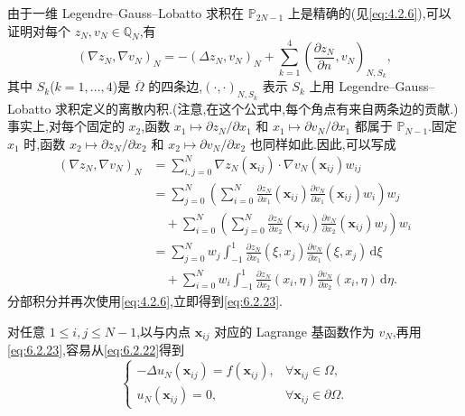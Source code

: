 由于一维 Legendre--Gauss--Lobatto 求积在 \(\mathbb P_{2N-1}\) 上是精确的(见\eqref{eq:4.2.6}),可以证明对每个 \(z_N,v_N\in\mathbb Q_N\),有
\begin{equation}\label{eq:6.2.23}
  (\nabla z_N,\nabla v_N)_N=-(\Delta z_N,v_N)_N
      +\sum_{k=1}^4\left(\frac{\partial z_N}{\partial n},v_N\right)_{N,S_k},
\end{equation}
其中 \(S_k\)(\(k=1,\ldots,4\))是 \(\overline\Omega\) 的四条边,\((\cdot,\cdot)_{N,S_k}\) 表示 \(S_k\) 上用 Legendre--Gauss--Lobatto 求积定义的离散内积.(注意,在这个公式中,每个角点有来自两条边的贡献.)事实上,对每个固定的 \(x_2\),函数 \(x_1\mapsto\partial z_N/\partial x_1\) 和 \(x_1\mapsto\partial v_N/\partial x_1\) 都属于 \(\mathbb P_{N-1}\).固定 \(x_1\) 时,函数 \(x_2\mapsto\partial z_N/\partial x_2\) 和 \(x_2\mapsto\partial v_N/\partial x_2\) 也同样如此.因此,可以写成
\[
  \begin{aligned}
    (\nabla z_N,\nabla v_N)_N
      &=\sum_{i,j=0}^N\nabla z_N(\boldsymbol{x}_{ij})\cdot\nabla v_N(\boldsymbol{x}_{ij})w_{ij}\\
      &=\sum_{j=0}^N\left(\sum_{i=0}^N
          \frac{\partial z_N}{\partial x_1}(\boldsymbol{x}_{ij})
          \frac{\partial v_N}{\partial x_1}(\boldsymbol{x}_{ij})w_i\right)w_j\\
      &\quad+\sum_{i=0}^N\left(\sum_{j=0}^N
          \frac{\partial z_N}{\partial x_2}(\boldsymbol{x}_{ij})
          \frac{\partial v_N}{\partial x_2}(\boldsymbol{x}_{ij})w_j\right)w_i\\
      &=\sum_{j=0}^Nw_j\int_{-1}^1
          \frac{\partial z_N}{\partial x_1}(\xi,x_j)
          \frac{\partial v_N}{\partial x_1}(\xi,x_j)\,\mathrm d\xi\\
      &\quad+\sum_{i=0}^Nw_i\int_{-1}^1
          \frac{\partial z_N}{\partial x_2}(x_i,\eta)
          \frac{\partial v_N}{\partial x_2}(x_i,\eta)\,\mathrm d\eta.
  \end{aligned}
\]
分部积分并再次使用\eqref{eq:4.2.6},立即得到\eqref{eq:6.2.23}.

对任意 \(1\le i,j\le N-1\),以与内点 \(\boldsymbol{x}_{ij}\) 对应的 Lagrange 基函数作为 \(v_N\),再用\eqref{eq:6.2.23},容易从\eqref{eq:6.2.22}得到
\begin{equation}\label{eq:6.2.24}
  \begin{cases}
    -\Delta u_N(\boldsymbol{x}_{ij})=f(\boldsymbol{x}_{ij}),
        &\forall\boldsymbol{x}_{ij}\in\Omega,\\
    u_N(\boldsymbol{x}_{ij})=0,&\forall\boldsymbol{x}_{ij}\in\partial\Omega.
  \end{cases}
\end{equation}

